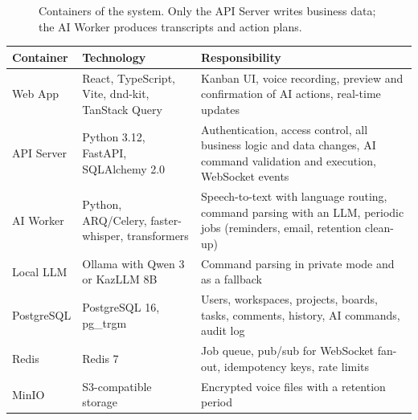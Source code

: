 \documentclass[11pt,a4paper]{article}
\newcommand{\tblstart}{\small\rowcolors{2}{gray!7}{white}}
\begin{document}
\begin{figure}[H]
\caption{Containers of the system. Only the API Server writes business data; the AI Worker produces transcripts and action plans.}
\end{figure}

{\tblstart
\begin{xltabular}{\textwidth}{P{2.6cm} P{3.6cm} L}
\toprule
\textbf{Container} & \textbf{Technology} & \textbf{Responsibility} \\
\midrule
\endhead
Web App & React, TypeScript, Vite, dnd-kit, TanStack Query & Kanban UI, voice recording, preview and confirmation of AI actions, real-time updates \\
API Server & Python 3.12, FastAPI, SQLAlchemy 2.0 & Authentication, access control, all business logic and data changes, AI command validation and execution, WebSocket events \\
AI Worker & Python, ARQ/Celery, faster-whisper, transformers & Speech-to-text with language routing, command parsing with an LLM, periodic jobs (reminders, email, retention clean-up) \\
Local LLM & Ollama with Qwen 3 or KazLLM 8B & Command parsing in private mode and as a fallback \\
PostgreSQL & PostgreSQL 16, pg\_trgm & Users, workspaces, projects, boards, tasks, comments, history, AI commands, audit log \\
Redis & Redis 7 & Job queue, pub/sub for WebSocket fan-out, idempotency keys, rate limits \\
MinIO & S3-compatible storage & Encrypted voice files with a retention period \\
\bottomrule
\end{xltabular}}
\end{document}
